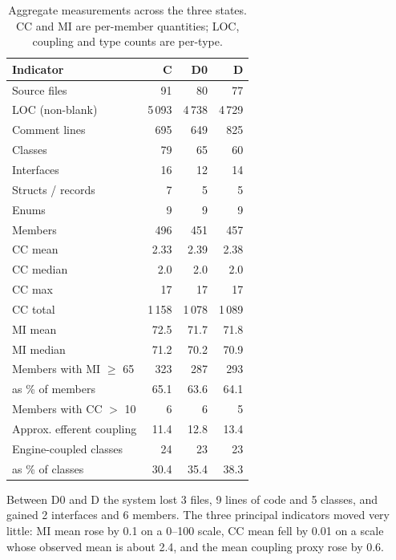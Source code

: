 \documentclass[pdflatex,sn-basic]{sn-jnl}
\begin{document}
\begin{table}[!htbp]
\centering
\caption{Aggregate measurements across the three states. CC and MI are per-member quantities; LOC, coupling and type counts are per-type.}\label{tab:aggregate}
\small
\begin{tabular}{lrrr}
\toprule
\textbf{Indicator} & \textbf{C} & \textbf{D0} & \textbf{D} \\
\midrule
Source files            & 91    & 80    & 77 \\
LOC (non-blank)         & 5\,093 & 4\,738 & 4\,729 \\
Comment lines           & 695   & 649   & 825 \\
Classes                 & 79    & 65    & 60 \\
Interfaces              & 16    & 12    & 14 \\
Structs / records       & 7     & 5     & 5 \\
Enums                   & 9     & 9     & 9 \\
Members                 & 496   & 451   & 457 \\
\addlinespace
CC mean                 & 2.33  & 2.39  & 2.38 \\
CC median               & 2.0   & 2.0   & 2.0 \\
CC max                  & 17    & 17    & 17 \\
CC total                & 1\,158 & 1\,078 & 1\,089 \\
\addlinespace
MI mean                 & 72.5  & 71.7  & 71.8 \\
MI median               & 71.2  & 70.2  & 70.9 \\
Members with MI $\geq$ 65 & 323 & 287   & 293 \\
\quad as \% of members   & 65.1  & 63.6  & 64.1 \\
Members with CC $>$ 10   & 6     & 6     & 5 \\
\addlinespace
Approx. efferent coupling & 11.4 & 12.8  & 13.4 \\
Engine-coupled classes  & 24    & 23    & 23 \\
\quad as \% of classes  & 30.4  & 35.4  & 38.3 \\
\bottomrule
\end{tabular}
\end{table}

Between D0 and D the system lost 3 files, 9 lines of code and 5 classes, and gained 2 interfaces and 6 members. The three principal indicators moved very little: MI mean rose by 0.1 on a 0--100 scale, CC mean fell by 0.01 on a scale whose observed mean is about 2.4, and the mean coupling proxy rose by 0.6.
\end{document}
